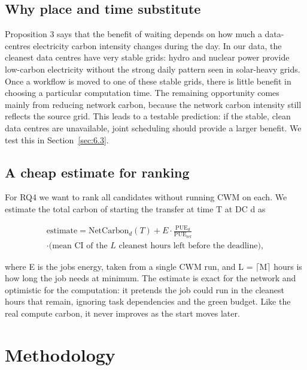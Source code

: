 \documentclass[12pt,a4paper,oneside,openany]{report}
\begin{document}
\section{Why place and time substitute}\label{sec:3.6}

Proposition 3 says that the benefit of waiting depends on how much a
data-centre\textquotesingle s electricity carbon intensity changes
during the day. In our data, the cleanest data centres have very stable
grids: hydro and nuclear power provide low-carbon electricity without
the strong daily pattern seen in solar-heavy grids. Once a workflow is
moved to one of these stable grids, there is little benefit in choosing
a particular computation time. The remaining opportunity comes mainly
from reducing network carbon, because the network carbon intensity still
reflects the source grid. This leads to a testable prediction: if the
stable, clean data centres are unavailable, joint scheduling should
provide a larger benefit. We test this in Section~\ref{sec:6.3}.

\section{A cheap estimate for ranking}\label{sec:3.7}

For RQ4 we want to rank all candidates without running CWM on each. We
estimate the total carbon of starting the transfer at time T at DC d as

\begin{multline}
\text{estimate} = \mathrm{NetCarbon}_d(T) + E \cdot \frac{\mathrm{PUE}_d}{\mathrm{PUE}_{\mathrm{ref}}} \\ \cdot \bigl(\text{mean CI of the } L \text{ cleanest hours left before the deadline}\bigr),\label{eq:3.7}
\end{multline}

where E is the job\textquotesingle s energy, taken from a single CWM
run, and L = \ensuremath{\lceil}M\ensuremath{\rceil} hours is how long the job needs at minimum. The
estimate is exact for the network and optimistic for the computation: it
pretends the job could run in the cleanest hours that remain, ignoring
task dependencies and the green budget. Like the real compute carbon, it
never improves as the start moves later.

\chapter{Methodology}\label{ch:4}
\end{document}
